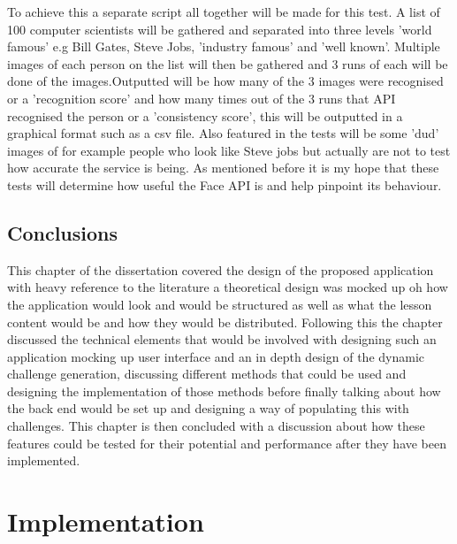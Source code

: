 \documentclass[12pt,a4paper]{article}
\begin{document}
To achieve this a separate script all together will be made for this test. A list of 100 computer scientists will be gathered and separated into three levels 'world famous' e.g Bill Gates, Steve Jobs, 'industry famous' and 'well known'. Multiple images of each person on the list will then be gathered and 3 runs of each will be done of the images.Outputted will be how many of the 3 images were recognised or a 'recognition score' and how many times out of the 3 runs that API recognised the person or a 'consistency score', this will be outputted in a graphical format such as a csv file. Also featured in the tests will be  some 'dud' images of for example people who look like Steve jobs but actually are not to test how accurate the service is being. As mentioned before it is my hope that these tests will determine how useful the Face API is and help pinpoint its behaviour. 

\subsection{Conclusions}
This chapter of the dissertation covered the design of the proposed application with heavy reference to the literature a theoretical design was mocked up oh how the application would look and would be structured as well as what the lesson content would be and how they would be distributed. Following this the chapter discussed the technical elements that would be involved with designing such an application mocking up user interface and an in depth design of the dynamic challenge generation, discussing different methods that could be used and designing the implementation of those methods before finally talking about how the back end would be set up and designing a way of populating this with challenges. This chapter is then concluded with a discussion about how these features could be tested for their potential and performance after they have been implemented.

\newpage
\section{Implementation}
\end{document}
